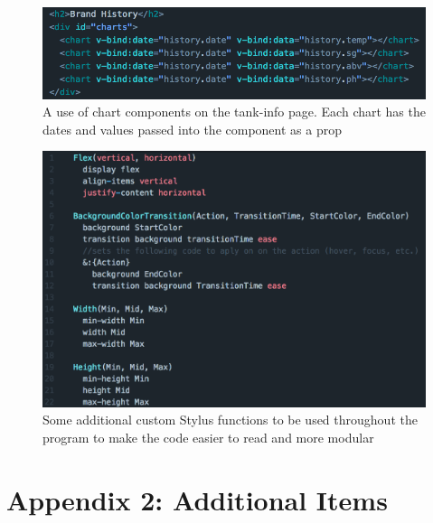 \documentclass[draftclsnofoot,onecolumn,letterpaper,10pt]{IEEEtran}
\begin{document}
\begin{figure}[H]
	\centering
	\includegraphics[scale=.3]{./code/components.png}
	\caption{A use of chart components on the tank-info page. Each chart has the dates and values passed into the component as a prop}
\end{figure}

\begin{figure}[H]
	\centering
	\includegraphics[scale=.3]{./code/mixins.png}
	\caption{Some additional custom Stylus functions to be used throughout the program to make the code easier to read and more modular}
\end{figure}

\section{Appendix 2: Additional Items}
\end{document}
